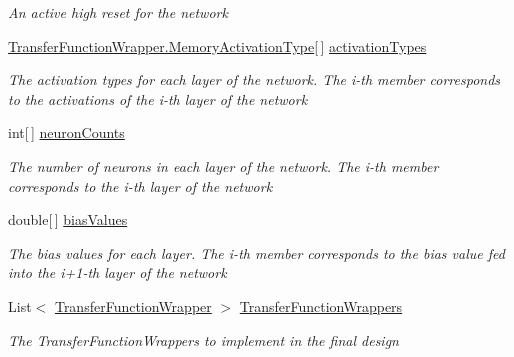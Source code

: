\begin{DoxyCompactItemize}
\begin{DoxyCompactList}\small\item\em An active high reset for the network \end{DoxyCompactList}\item 
\hyperlink{class_n_n_gen_1_1_transfer_function_wrapper_aa338ffadb8fcdf76df75419374a51ff6}{Transfer\+Function\+Wrapper.\+Memory\+Activation\+Type}\mbox{[}$\,$\mbox{]} \hyperlink{class_n_n_gen_1_1_sync_neural_network_ab9c0e21b58643ab79c5a540181f91a09}{activation\+Types}
\begin{DoxyCompactList}\small\item\em The activation types for each layer of the network. The i-\/th member corresponds to the activations of the i-\/th layer of the network \end{DoxyCompactList}\item 
int\mbox{[}$\,$\mbox{]} \hyperlink{class_n_n_gen_1_1_sync_neural_network_aed5af731ce355a68af7607477e8544e9}{neuron\+Counts}
\begin{DoxyCompactList}\small\item\em The number of neurons in each layer of the network. The i-\/th member corresponds to the i-\/th layer of the network \end{DoxyCompactList}\item 
double\mbox{[}$\,$\mbox{]} \hyperlink{class_n_n_gen_1_1_sync_neural_network_ae766b78572c54e97ec3be60f7d623dc7}{bias\+Values}
\begin{DoxyCompactList}\small\item\em The bias values for each layer. The i-\/th member corresponds to the bias value fed into the i+1-\/th layer of the network \end{DoxyCompactList}\item 
List$<$ \hyperlink{class_n_n_gen_1_1_transfer_function_wrapper}{Transfer\+Function\+Wrapper} $>$ \hyperlink{class_n_n_gen_1_1_sync_neural_network_ad94e116de1c91c9e5f6deb61df5bb23f}{Transfer\+Function\+Wrappers}
\begin{DoxyCompactList}\small\item\em The Transfer\+Function\+Wrappers to implement in the final design \end{DoxyCompactList}\item 

\end{DoxyCompactItemize}
